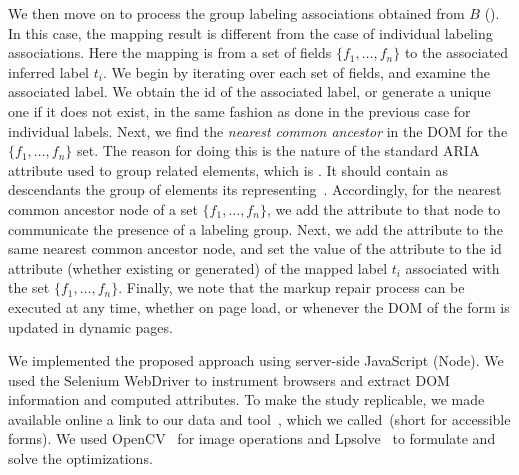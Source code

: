 We then move on to process the group labeling associations 
obtained from $B$ (). In this case, the mapping 
result is different from the case of individual labeling 
associations. Here the mapping is from a set of fields 
$\{f_1, \ldots, f_n\}$ to the associated inferred label 
$t_i$. We begin by iterating over each set of fields, and 
examine the associated label. We obtain the id of the associated label, 
or generate a unique one if it does not exist, in the same 
fashion as done in the previous case for individual labels. 
Next, we find the \emph{nearest common ancestor} in the DOM 
for the $\{f_1, \ldots, f_n\}$ set. The reason for doing this 
is the nature of the standard ARIA attribute used to group 
related elements, which is . It should 
contain as descendants the group of elements its representing~\cite{aria-group-markup}. 
Accordingly, for the nearest common ancestor node of a set $\{f_1, \ldots, f_n\}$, 
we add the attribute  to that node to 
communicate the presence of a labeling group. Next, we add 
the  attribute to the same nearest common 
ancestor node, and set the value of the attribute to the id 
attribute (whether existing or generated) of the mapped label $t_i$ 
associated with the set $\{f_1, \ldots, f_n\}$. Finally, we note 
that the markup repair process can be executed at any time, 
whether on page load, or whenever the DOM of the form is updated 
in dynamic pages. 


We implemented the proposed approach using server-side JavaScript 
(Node). We used the Selenium WebDriver to instrument browsers and 
extract DOM information and computed attributes. To make the study 
replicable, we made available online a link to our data and 
tool~\cite{tool-and-data}, which we called~\toolname (short for 
accessible forms). We used OpenCV~\cite{opencv} for image operations 
and Lpsolve~\cite{lpsolve} to formulate and solve the optimizations. 

